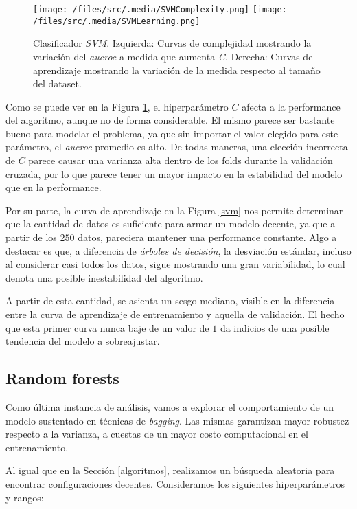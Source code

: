 \begin{figure}[!htbp] 
    \centering
    \texttt{[image: /files/src/.media/SVMComplexity.png]}
    \texttt{[image: /files/src/.media/SVMLearning.png]}
    \caption{Clasificador \textit{SVM}. Izquierda: Curvas de complejidad mostrando la variación del \textit{aucroc} a medida que aumenta \textit{C}. Derecha: Curvas de aprendizaje mostrando la variación de la medida respecto al tamaño del dataset.}
    \label{SVMCurves}
\end{figure}

Como se puede ver en la Figura \ref{SVMCurves}, el hiperparámetro $C$ afecta a la performance del algoritmo, aunque no de forma considerable. El mismo parece ser bastante bueno para modelar el problema, ya que sin importar el valor elegido para este parámetro, el \textit{aucroc} promedio es alto. De todas maneras, una elección incorrecta de $C$ parece causar una varianza alta dentro de los folds durante la validación cruzada, por lo que parece tener un mayor impacto en la estabilidad del modelo que en la performance.
 
Por su parte, la curva de aprendizaje en la Figura \ref{svm} nos permite determinar que la cantidad de datos es suficiente para armar un modelo decente, ya que a partir de los $250$ datos, pareciera mantener una performance constante. Algo a destacar es que, a diferencia de \textit{árboles de decisión}, la desviación estándar, incluso al considerar casi todos los datos, sigue mostrando una gran variabilidad, lo cual denota una posible inestabilidad del algoritmo. 

A partir de esta cantidad, se asienta un sesgo mediano, visible en la diferencia entre la curva de aprendizaje de entrenamiento y aquella de validación. El hecho que esta primer curva nunca baje de un valor de $1$ da indicios de una posible tendencia del modelo a sobreajustar. 

\subsection{Random forests} Como última instancia de análisis, vamos a explorar el comportamiento de un modelo sustentado en técnicas de \textit{bagging}. Las mismas garantizan mayor robustez respecto a la varianza, a cuestas de un mayor costo computacional en el entrenamiento. 

Al igual que en la Sección \ref{algoritmos}, realizamos un búsqueda aleatoria para encontrar configuraciones decentes. Consideramos los siguientes hiperparámetros y rangos:

